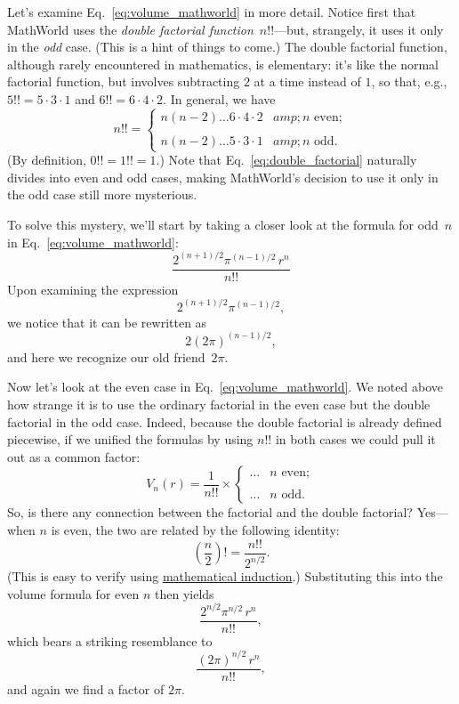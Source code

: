 Let's examine Eq.~\eqref{eq:volume_mathworld} in more detail. Notice first that MathWorld uses the \emph{double factorial function}~$n!!$---but, strangely, it uses it only in the \emph{odd} case. (This is a hint of things to come.) The double factorial function, although rarely encountered in mathematics, is elementary: it's like the normal factorial function, but involves subtracting $2$ at a time instead of $1$, so that, e.g., $5!! = 5 \cdot 3 \cdot 1$ and $6!! = 6 \cdot 4 \cdot 2$. In general, we have
\begin{equation}
\label{eq:double_factorial}
n!! = \begin{cases}
n(n-2)\ldots6\cdot4\cdot2 &amp; n \text{ even}; \\ \\
n(n-2)\ldots5\cdot3\cdot1 &amp; n \text{ odd}.
\end{cases}
\end{equation}
(By definition, $0!! = 1!! = 1$.) Note that Eq.~\eqref{eq:double_factorial} naturally divides into even and odd cases, making MathWorld's decision to use it only in the odd case still more mysterious.

To solve this mystery, we'll start by taking a closer look at the formula for odd~$n$ in Eq.~\eqref{eq:volume_mathworld}:
\[ \frac{2^{(n+1)/2}\pi^{(n-1)/2}\,r^n}{n!!} \]
Upon examining the expression
\[ 2^{(n+1)/2}\pi^{(n-1)/2}, \]
we notice that it can be rewritten as
\[ 2(2\pi)^{(n-1)/2}, \]
and here we recognize our old friend~$2\pi$.

Now let's look at the even case in Eq.~\eqref{eq:volume_mathworld}. We noted above how strange it is to use the ordinary factorial in the even case but the double factorial in the odd case. Indeed, because the double factorial is already defined piecewise, if we unified the formulas by using $n!!$ in both cases we could pull it out as a common factor:
\[
V_n(r) = \frac{1}{n!!}\times \begin{cases}
\ldots & n \text{ even}; \\ \\
 \ldots & n \text{ odd}.
 \end{cases}
\]
So, is there any connection between the factorial and the double factorial? Yes---when $n$ is even, the two are related by the following identity:
\[ \left(\frac{n}{2}\right)! = \frac{n!!}{2^{n/2}}. \]
(This is easy to verify using \href{https://en.wikipedia.org/wiki/Mathematical_induction}{mathematical induction}.) Substituting this into the volume formula for even $n$ then yields
\[ \frac{2^{n/2}\pi^{n/2}\,r^n}{n!!}, \]
which bears a striking resemblance to
\[ \frac{(2\pi)^{n/2}\,r^n}{n!!}, \]
and again we find a factor of $2\pi$.

